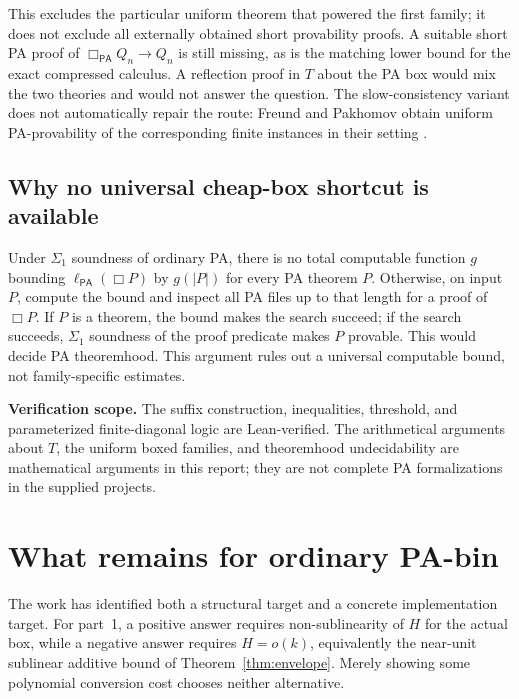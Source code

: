 \documentclass[11pt]{article}
\theoremstyle{definition}
\theoremstyle{remark}
\newcommand{\PA}{\mathsf{PA}}
\newcommand{\status}[1]{\par\smallskip\noindent\textbf{Verification scope.} #1\par\smallskip}
\begin{document}
This excludes the particular uniform theorem that powered the first family;
it does not exclude all externally obtained short provability proofs. A
suitable short PA proof of $\Box_{\PA}Q_n\to Q_n$ is still missing, as is
the matching lower bound for the exact compressed calculus. A reflection
proof in $T$ about the PA box would mix the two theories and would not answer
the question. The slow-consistency variant does not automatically repair the
route: Freund and Pakhomov obtain uniform PA-provability of the corresponding
finite instances in their setting \cite[Corollary 2.4; Proposition 3.7]{fp}.

\subsection{Why no universal cheap-box shortcut is available}
Under $\Sigma_1$ soundness of ordinary PA, there is no total computable
function $g$ bounding $\ell_{\PA}(\Box P)$ by $g(|P|)$ for every PA theorem
$P$. Otherwise, on input $P$, compute the bound and inspect all PA files up
to that length for a proof of $\Box P$. If $P$ is a theorem, the bound makes
the search succeed; if the search succeeds, $\Sigma_1$ soundness of the proof
predicate makes $P$ provable. This would decide PA theoremhood. This argument
rules out a universal computable bound, not family-specific estimates.

\status{The suffix construction, inequalities, threshold, and parameterized
finite-diagonal logic are Lean-verified. The arithmetical arguments about
$T$, the uniform boxed families, and theoremhood undecidability are
mathematical arguments in this report; they are not complete PA
formalizations in the supplied projects.}

\section{What remains for ordinary PA-bin}
\label{sec:remaining}

The work has identified both a structural target and a concrete implementation
target. For part~1, a positive answer requires non-sublinearity of $H$ for the
actual box, while a negative answer requires $H=o(k)$, equivalently the
near-unit sublinear additive bound of Theorem~\ref{thm:envelope}. Merely
showing some polynomial conversion cost chooses neither alternative.
\end{document}
